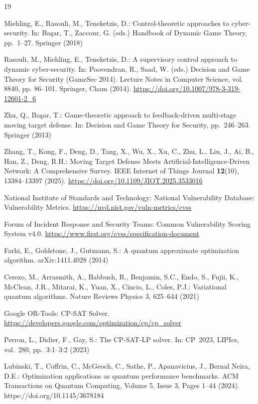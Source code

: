 \documentclass[runningheads]{llncs}
\begin{document}
\begin{thebibliography}{19}

Miehling, E., Rasouli, M., Teneketzis, D.: Control-theoretic approaches to cyber-security. In: Ba\c{s}ar, T., Zaccour, G. (eds.) Handbook of Dynamic Game Theory, pp.~1--27. Springer (2018)

Rasouli, M., Miehling, E., Teneketzis, D.: A supervisory control approach to dynamic cyber-security. In: Poovendran, R., Saad, W. (eds.) Decision and Game Theory for Security (GameSec 2014). Lecture Notes in Computer Science, vol. 8840, pp. 86--101. Springer, Cham (2014). \url{https://doi.org/10.1007/978-3-319-12601-2_6}

Zhu, Q., Ba\c{s}ar, T.: Game-theoretic approach to feedback-driven multi-stage moving target defense. In: Decision and Game Theory for Security, pp.~246--263. Springer (2013)

Zhang, T., Kong, F., Deng, D., Tang, X., Wu, X., Xu, C., Zhu, L., Liu, J., Ai, B., Han, Z., Deng, R.H.:
Moving Target Defense Meets Artificial-Intelligence-Driven Network: A Comprehensive Survey.
IEEE Internet of Things Journal \textbf{12}(10), 13384--13397 (2025).
\url{https://doi.org/10.1109/JIOT.2025.3533016}

National Institute of Standards and Technology: National Vulnerability Database: Vulnerability Metrics. \url{https://nvd.nist.gov/vuln-metrics/cvss}

Forum of Incident Response and Security Teams: Common Vulnerability Scoring System v4.0. \url{https://www.first.org/cvss/specification-document}

Farhi, E., Goldstone, J., Gutmann, S.: A quantum approximate optimization algorithm. arXiv:1411.4028 (2014)

Cerezo, M., Arrasmith, A., Babbush, R., Benjamin, S.C., Endo, S., Fujii, K., McClean, J.R., Mitarai, K., Yuan, X., Cincio, L., Coles, P.J.: Variational quantum algorithms. Nature Reviews Physics 3, 625--644 (2021)

Google OR-Tools: CP-SAT Solver. \url{https://developers.google.com/optimization/cp/cp_solver}

Perron, L., Didier, F., Gay, S.: The CP-SAT-LP solver. In: CP~2023, LIPIcs, vol.~280, pp.~3:1--3:2 (2023)

Lubinski, T., Coffrin, C., McGeoch, C., Sathe, P., Apanavicius, J., Bernal Neira, D.E.: Optimization applications as quantum performance benchmarks. ACM Transactions on Quantum Computing, Volume 5, Issue 3, Pages 1--44 (2024). https://doi.org/10.1145/3678184


\end{thebibliography}
\end{document}
